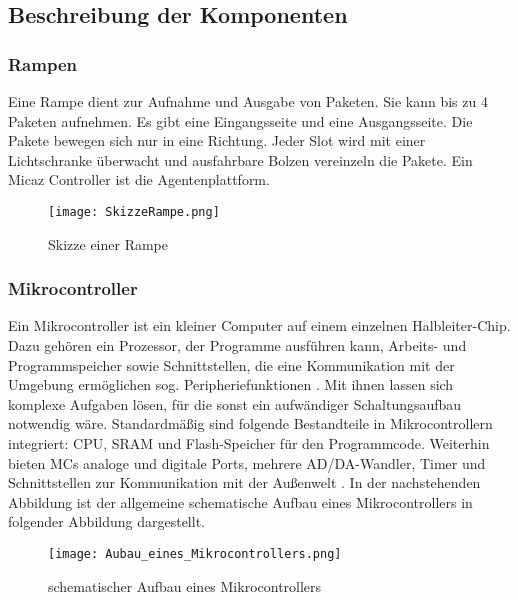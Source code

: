 \subsection{Beschreibung der Komponenten}
\subsubsection{Rampen}
Eine Rampe dient zur Aufnahme und Ausgabe von Paketen. Sie kann bis zu 4 Paketen aufnehmen. Es gibt eine Eingangsseite und eine Ausgangsseite. Die Pakete bewegen sich nur in eine Richtung. Jeder Slot wird mit einer Lichtschranke überwacht und ausfahrbare Bolzen vereinzeln die Pakete. Ein Micaz Controller ist die Agentenplattform. 
\begin{figure}[h!]
	\centering
		\texttt{[image: SkizzeRampe.png]}
	\caption{Skizze einer Rampe\cite{Stasch:Hahn}}
	\label{SkizzeRampe}
\end{figure}

\subsubsection{Mikrocontroller}
Ein Mikrocontroller ist ein kleiner Computer auf einem einzelnen Halbleiter-Chip. Dazu geh\"oren ein Prozessor,
der Programme ausf\"uhren kann, Arbeits- und Programmspeicher sowie Schnittstellen, die eine Kommunikation mit 
der Umgebung erm\"oglichen sog. Peripheriefunktionen \cite{Wikibooks:2014:Online}. Mit ihnen lassen sich komplexe
Aufgaben l\"osen, f\"ur die sonst ein aufw\"andiger Schaltungsaufbau notwendig w\"are. Standardm\"a{\ss}ig sind folgende Bestandteile in Mikrocontrollern integriert:
CPU, SRAM und Flash-Speicher f\"ur den Programmcode. Weiterhin bieten MCs analoge und digitale Ports, 
mehrere AD/DA-Wandler, Timer und Schnittstellen zur Kommunikation mit der Außenwelt \cite[vgl.]{Viktor:Seib:2014:Online}.
In der nachstehenden Abbildung ist der allgemeine schematische Aufbau eines Mikrocontrollers in folgender Abbildung dargestellt.
\begin{figure}[h!]
	\centering
		\texttt{[image: Aubau\_eines\_Mikrocontrollers.png]}
	\caption{schematischer Aufbau eines Mikrocontrollers \cite{habil:Ostermeye:2014:Online}}
	\label{Aufbau eines Mikrocontrollers}
\end{figure}

